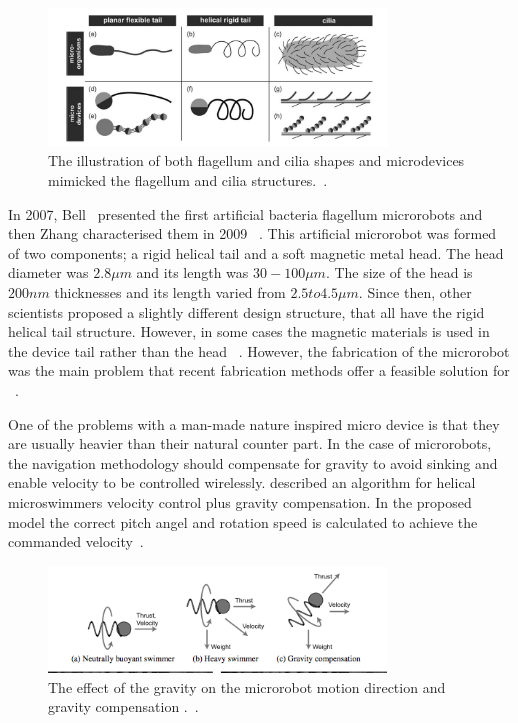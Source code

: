 \documentclass[a4paper,11pt]{article}
\begin{document}
\begin{sloppypar}
\begin{figure}
  \centering
    \includegraphics[width=0.8\textwidth]{cilia}
  \caption{The illustration of both flagellum and cilia shapes and microdevices mimicked the flagellum and cilia 
structures.~\citep{peyer2013bio}.}
  \label{cilia}
\end{figure}

In 2007, Bell ~\citep{gao2013bioinspired}presented the first artificial bacteria flagellum microrobots and then
 Zhang characterised them in 2009 ~\citep{gao2013bioinspired}. This artificial microrobot was formed of two 
components; a rigid helical tail and a soft magnetic metal head. The head diameter 
was $2.8 \mu  m$ and its length was $30-100 \mu m$. The size of the head is $200 nm$ thicknesses and its 
length varied from $2.5 to 4.5 \mu m$. Since then, other scientists proposed a slightly different design 
structure, that all have the rigid helical tail structure. However, in some cases the magnetic
 materials is used in the device tail rather than the head ~\citep{gao2013bioinspired}. 
However, the fabrication of the microrobot was the main problem that recent fabrication methods 
offer a feasible solution for ~\citep{gao2013bioinspired}. 





One of the problems with a man-made nature inspired micro device is that they are 
usually heavier than their natural counter part. In the case of microrobots, the navigation methodology should compensate for gravity to avoid sinking and enable velocity to be 
controlled wirelessly. \citeauthor{mahoney2011velocity} described an algorithm for helical microswimmers velocity 
control plus gravity compensation. In the proposed model the correct pitch angel and 
rotation speed is calculated to achieve the commanded velocity~\citep{mahoney2011velocity}.

\begin{figure}
  \centering
    \includegraphics[width=0.8\textwidth]{11}
  \caption{The effect of the gravity on the microrobot motion direction and gravity compensation .~\citep{mahoney2011velocity}.}
  \label{11}
\end{figure}




\end{sloppypar}
\end{document}
